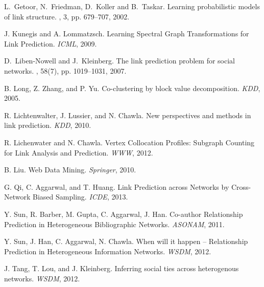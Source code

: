 \documentclass[10pt,journal,compsoc]{IEEEtran}
\begin{document}
\begin{thebibliography}{1}
L.~Getoor, N.~Friedman, D.~Koller and B.~Taskar.
\newblock  Learning probabilistic models of link structure.
, 3, pp. 679--707, 2002.






J. Kunegis and A. Lommatzsch.  Learning Spectral Graph
Transformations for Link Prediction. {\em ICML}, 2009.



D.~Liben-Nowell and J.~Kleinberg.
\newblock The link prediction problem for social networks.
,
58(7), pp. 1019--1031, 2007.

 B. Long, Z.  Zhang, and P. Yu. Co-clustering by block value decomposition.
{\em KDD}, 2005.


 R. Lichtenwalter, J. Lussier, and N. Chawla. New perspectives and
methods in link prediction. {\em  KDD},  2010.



 R. Lichenwater and N.  Chawla.
Vertex Collocation Profiles: Subgraph Counting for Link Analysis and
Prediction. {\em WWW}, 2012.

 B. Liu. Web Data Mining. {\em Springer}, 2010.

 G.  Qi, C. Aggarwal, and T. Huang. Link Prediction
across Networks by Cross-Network Biased Sampling. {\em ICDE}, 2013.



 Y. Sun, R. Barber, M. Gupta,  C. Aggarwal, J.
Han.  Co-author Relationship Prediction in Heterogeneous
Bibliographic Networks.  {\em ASONAM}, 2011.

 Y. Sun, J. Han, C. Aggarwal, N. Chawla.  When will it
happen -- Relationship Prediction in Heterogeneous Information
Networks.  {\em WSDM}, 2012.


   J. Tang, T. Lou,  and J. Kleinberg.
 Inferring social ties across heterogenous networks. {\em  WSDM}, 2012.



\end{thebibliography}
\end{document}
